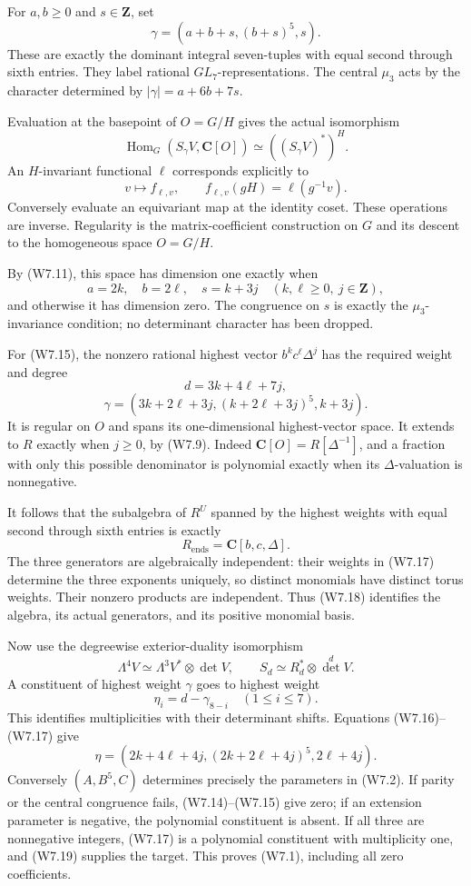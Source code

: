 \documentclass[
  10pt,
]{article}
\begin{document}
For \(a,b\ge0\) and \(s\in\mathbf Z\), set \[
\gamma=(a+b+s,(b+s)^5,s).
\tag{W7.13}
\] These are exactly the dominant integral seven-tuples with equal
second through sixth entries. They label rational
\(GL_7\)-representations. The central \(\mu_3\) acts by the character
determined by \(|\gamma|=a+6b+7s\).

Evaluation at the basepoint of \(O=G/H\) gives the actual isomorphism \[
\operatorname{Hom}_G(S_\gamma V,\mathbf C[O])
\simeq((S_\gamma V)^*)^H.
\tag{W7.14}
\] An \(H\)-invariant functional \(\ell\) corresponds explicitly to \[
v\longmapsto f_{\ell,v},\qquad
f_{\ell,v}(gH)=\ell(g^{-1}v).
\] Conversely evaluate an equivariant map at the identity coset. These
operations are inverse. Regularity is the matrix-coefficient
construction on \(G\) and its descent to the homogeneous space
\(O=G/H\).

By (W7.11), this space has dimension one exactly when \[
a=2k,\quad b=2\ell,\quad s=k+3j
\quad(k,\ell\ge0,\ j\in\mathbf Z),
\tag{W7.15}
\] and otherwise it has dimension zero. The congruence on \(s\) is
exactly the \(\mu_3\)-invariance condition; no determinant character has
been dropped.

For (W7.15), the nonzero rational highest vector \(b^kc^\ell\Delta^j\)
has the required weight and degree \[
d=3k+4\ell+7j,
\tag{W7.16}
\] \[
\gamma=(3k+2\ell+3j,(k+2\ell+3j)^5,k+3j).
\tag{W7.17}
\] It is regular on \(O\) and spans its one-dimensional highest-vector
space. It extends to \(R\) exactly when \(j\ge0\), by (W7.9). Indeed
\(\mathbf C[O]=R[\Delta^{-1}]\), and a fraction with only this possible
denominator is polynomial exactly when its \(\Delta\)-valuation is
nonnegative.

It follows that the subalgebra of \(R^U\) spanned by the highest weights
with equal second through sixth entries is exactly \[
\boxed{R_{\mathrm{ends}}=\mathbf C[b,c,\Delta].}
\tag{W7.18}
\] The three generators are algebraically independent: their weights in
(W7.17) determine the three exponents uniquely, so distinct monomials
have distinct torus weights. Their nonzero products are independent.
Thus (W7.18) identifies the algebra, its actual generators, and its
positive monomial basis.

Now use the degreewise exterior-duality isomorphism \[
\Lambda^4V\simeq\Lambda^3V^*\otimes\det V,
\qquad
S_d\simeq R_d^*\otimes\det^dV.
\tag{W7.19}
\] A constituent of highest weight \(\gamma\) goes to highest weight \[
\eta_i=d-\gamma_{8-i}\quad(1\le i\le7).
\tag{W7.20}
\] This identifies multiplicities with their determinant shifts.
Equations (W7.16)--(W7.17) give \[
\eta=(2k+4\ell+4j,(2k+2\ell+4j)^5,2\ell+4j).
\tag{W7.21}
\] Conversely \((A,B^5,C)\) determines precisely the parameters in
(W7.2). If parity or the central congruence fails, (W7.14)--(W7.15) give
zero; if an extension parameter is negative, the polynomial constituent
is absent. If all three are nonnegative integers, (W7.17) is a
polynomial constituent with multiplicity one, and (W7.19) supplies the
target. This proves (W7.1), including all zero coefficients.
\end{document}
